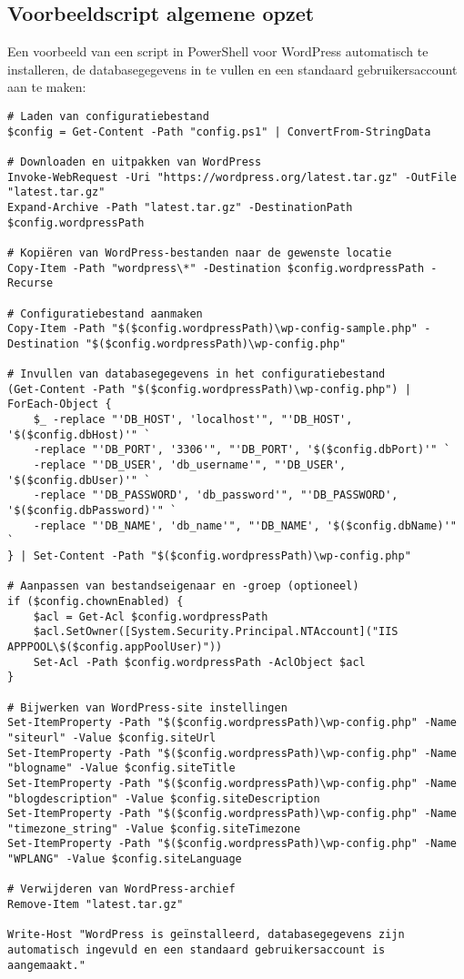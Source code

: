 \subsection{Voorbeeldscript algemene opzet}
Een voorbeeld van een script in PowerShell voor WordPress automatisch te installeren, de databasegegevens in te vullen en een standaard gebruikersaccount aan te maken:
\begin{verbatim}
# Laden van configuratiebestand
$config = Get-Content -Path "config.ps1" | ConvertFrom-StringData

# Downloaden en uitpakken van WordPress
Invoke-WebRequest -Uri "https://wordpress.org/latest.tar.gz" -OutFile "latest.tar.gz"
Expand-Archive -Path "latest.tar.gz" -DestinationPath $config.wordpressPath

# Kopiëren van WordPress-bestanden naar de gewenste locatie
Copy-Item -Path "wordpress\*" -Destination $config.wordpressPath -Recurse

# Configuratiebestand aanmaken
Copy-Item -Path "$($config.wordpressPath)\wp-config-sample.php" -Destination "$($config.wordpressPath)\wp-config.php"

# Invullen van databasegegevens in het configuratiebestand
(Get-Content -Path "$($config.wordpressPath)\wp-config.php") |
ForEach-Object {
    $_ -replace "'DB_HOST', 'localhost'", "'DB_HOST', '$($config.dbHost)'" `
    -replace "'DB_PORT', '3306'", "'DB_PORT', '$($config.dbPort)'" `
    -replace "'DB_USER', 'db_username'", "'DB_USER', '$($config.dbUser)'" `
    -replace "'DB_PASSWORD', 'db_password'", "'DB_PASSWORD', '$($config.dbPassword)'" `
    -replace "'DB_NAME', 'db_name'", "'DB_NAME', '$($config.dbName)'" `
} | Set-Content -Path "$($config.wordpressPath)\wp-config.php"

# Aanpassen van bestandseigenaar en -groep (optioneel)
if ($config.chownEnabled) {
    $acl = Get-Acl $config.wordpressPath
    $acl.SetOwner([System.Security.Principal.NTAccount]("IIS APPPOOL\$($config.appPoolUser)"))
    Set-Acl -Path $config.wordpressPath -AclObject $acl
}

# Bijwerken van WordPress-site instellingen
Set-ItemProperty -Path "$($config.wordpressPath)\wp-config.php" -Name "siteurl" -Value $config.siteUrl
Set-ItemProperty -Path "$($config.wordpressPath)\wp-config.php" -Name "blogname" -Value $config.siteTitle
Set-ItemProperty -Path "$($config.wordpressPath)\wp-config.php" -Name "blogdescription" -Value $config.siteDescription
Set-ItemProperty -Path "$($config.wordpressPath)\wp-config.php" -Name "timezone_string" -Value $config.siteTimezone
Set-ItemProperty -Path "$($config.wordpressPath)\wp-config.php" -Name "WPLANG" -Value $config.siteLanguage

# Verwijderen van WordPress-archief
Remove-Item "latest.tar.gz"

Write-Host "WordPress is geïnstalleerd, databasegegevens zijn automatisch ingevuld en een standaard gebruikersaccount is aangemaakt."
\end{verbatim}

